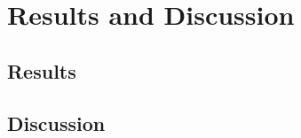 
\chapter{Results and Discussion}\label{resultsDiscussion}


\section{Results}\label{results}



\section{Discussion}\label{discussion}